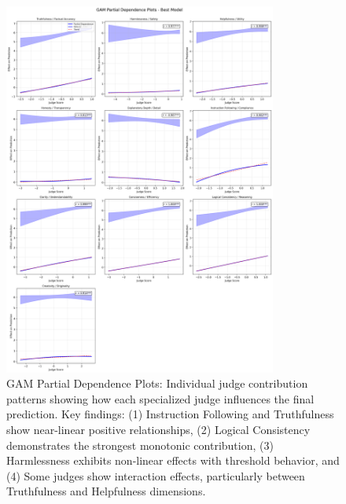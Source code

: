 \begin{figure}[htbp]
    \centering
    \includegraphics[width=0.8\textwidth]{results/full_experiments/baseline_ultrafeedback_2000samples_20250816_213023/gam_analysis/gam_tuning_run_20250818_142018/gam_partial_dependence_plots.png}
    \caption{GAM Partial Dependence Plots: Individual judge contribution patterns showing how each specialized judge influences the final prediction. Key findings: (1) Instruction Following and Truthfulness show near-linear positive relationships, (2) Logical Consistency demonstrates the strongest monotonic contribution, (3) Harmlessness exhibits non-linear effects with threshold behavior, and (4) Some judges show interaction effects, particularly between Truthfulness and Helpfulness dimensions.}
    \label{fig:gam_partial_dependence}
\end{figure}

